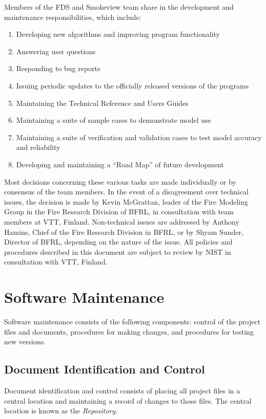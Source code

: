 \documentclass[11pt]{book}
\begin{document}
Members of the FDS and Smokeview team share in the development and maintenance responsibilities, which include:
\begin{enumerate}
\item Developing new algorithms and improving program functionality
\item Answering user questions
\item Responding to bug reports
\item Issuing periodic updates to the officially released versions of the programs
\item Maintaining the Technical Reference and Users Guides
\item Maintaining a suite of sample cases to demonstrate model use
\item Maintaining a suite of verification and validation cases to test model accuracy and reliability
\item Developing and maintaining a ``Road Map'' of future development
\end{enumerate}
Most decisions concerning these various tasks are made individually or by consensus of the team members.
In the event of a disagreement over technical issues, the decision is made by Kevin McGrattan, leader of the Fire Modeling Group in the Fire Research Division of BFRL,
in consultation with team members at VTT, Finland.
Non-technical issues are addressed by Anthony Hamins, Chief of the Fire Research Division in BFRL, or by
Shyam Sunder, Director of BFRL, depending on the nature of the issue. All policies and procedures described in this document are
subject to review by NIST in consultation with VTT, Finland.






\chapter{Software Maintenance}

Software maintenance consists of the following components:
control of the project files and documents, procedures for making changes, and procedures for testing new versions.


\section{Document Identification and Control}

Document identification and control consists of placing all project files in a central location and maintaining a record of changes to those files.
The central location is known as the {\em Repository}.
\end{document}
